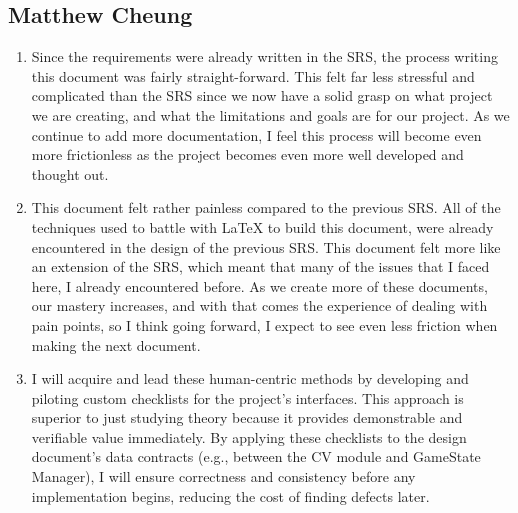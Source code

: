 \documentclass[12pt, titlepage]{article}
\begin{document}
\subsection*{Matthew Cheung}
\begin{enumerate}
    \item Since the requirements were already written in the SRS, the process writing this document was fairly straight-forward.
    This felt far less stressful and complicated than the SRS since we now have a solid grasp on what project we are creating, and what the limitations and goals are for our project.
    As we continue to add more documentation, I feel this process will become even more frictionless as the project becomes even more well developed and thought out.
    \item This document felt rather painless compared to the previous SRS.
    All of the techniques used to battle with LaTeX to build this document, were already encountered in the design of the previous SRS.
    This document felt more like an extension of the SRS, which meant that many of the issues that I faced here, I already encountered before.
    As we create more of these documents, our mastery increases, and with that comes the experience of dealing with pain points, so I think going forward, I expect to see even less friction when making the next document.
    \item I will acquire and lead these human-centric methods by developing and piloting custom checklists for the project's interfaces.
    This approach is superior to just studying theory because it provides demonstrable and verifiable value immediately.
    By applying these checklists to the design document's data contracts (e.g., between the CV module and GameState Manager), I will ensure correctness and consistency before any implementation begins, reducing the cost of finding defects later.
\end{enumerate}
\end{document}
